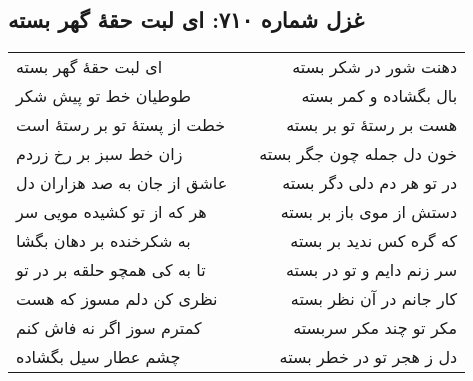 \begin{center}
\section*{غزل شماره ۷۱۰: ای لبت حقهٔ گهر بسته}
\label{sec:710}
\begin{longtable}{l p{0.5cm} r}
ای لبت حقهٔ گهر بسته
&&
دهنت شور در شکر بسته
\\
طوطیان خط تو پیش شکر
&&
بال بگشاده و کمر بسته
\\
خطت از پستهٔ تو بر رستهٔ است
&&
هست بر رستهٔ تو بر بسته
\\
زان خط سبز بر رخ زردم
&&
خون دل جمله چون جگر بسته
\\
عاشق از جان به صد هزاران دل
&&
در تو هر دم دلی دگر بسته
\\
هر که از تو کشیده مویی سر
&&
دستش از موی باز بر بسته
\\
به شکرخنده بر دهان بگشا
&&
که گره کس ندید بر بسته
\\
تا به کی همچو حلقه بر در تو
&&
سر زنم دایم و تو در بسته
\\
نظری کن دلم مسوز که هست
&&
کار جانم در آن نظر بسته
\\
کمترم سوز اگر نه فاش کنم
&&
مکر تو چند مکر سربسته
\\
چشم عطار سیل بگشاده
&&
دل ز هجر تو در خطر بسته
\\
\end{longtable}
\end{center}
